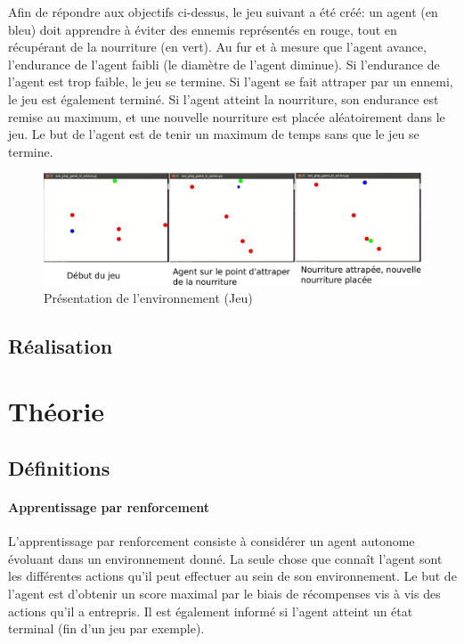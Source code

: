 \documentclass[11pt,a4paper]{report}
\begin{document}
  \par Afin de répondre aux objectifs ci-dessus, le jeu suivant a été créé: un agent (en bleu) doit apprendre à éviter des ennemis représentés en rouge, tout en récupérant de la nourriture (en vert). Au fur et à mesure que l'agent avance, l'endurance de l'agent faibli (le diamètre de l'agent diminue). Si l'endurance de l'agent est trop faible, le jeu se termine. Si l'agent se fait attraper par un ennemi, le jeu est également terminé. Si l'agent atteint la nourriture, son endurance est remise au maximum, et une nouvelle nourriture est placée aléatoirement dans le jeu. Le but de l'agent est de tenir un maximum de temps sans que le jeu se termine. 
  
   \begin{figure}[!h]
   \center
   \includegraphics[scale=0.2]{ressources/presentation_jeu.png}
   \caption{Présentation de l'environnement (Jeu)}
   \end{figure} 
  
  \section{Réalisation}
  
  \par 
  
  \chapter{Théorie}
  
  \section{Définitions}
  
  \subsubsection{Apprentissage par renforcement}  
  
    \par L'apprentissage par renforcement consiste à considérer un agent autonome évoluant dans un environnement donné. La seule chose que connaît l'agent sont les différentes actions qu'il peut effectuer au sein de son environnement. Le but de l'agent est d'obtenir un score maximal par le biais de récompenses vis à vis des actions qu'il a entrepris. Il est également informé si l'agent atteint un état terminal (fin d'un jeu par exemple). 
    
\end{document}
